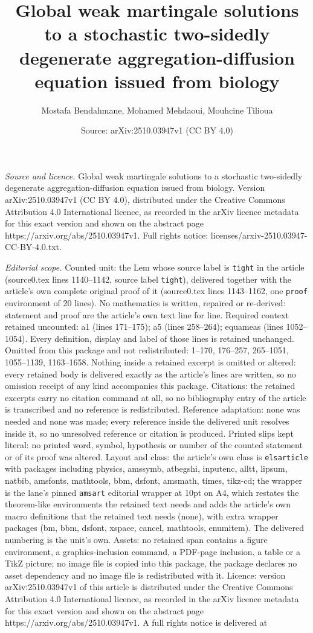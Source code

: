 \documentclass[10pt,a4paper]{amsart}
\title[Global weak martingale solutions to a stochastic two-sidedly]{Global weak martingale solutions to a stochastic two-sidedly degenerate aggregation-diffusion equation issued from biology}
\author{Mostafa Bendahmane, Mohamed Mehdaoui, Mouhcine Tilioua}
\date{Source: arXiv:2510.03947v1 (CC BY 4.0)}
\begin{document}
\maketitle

\noindent\emph{Source and licence.} Global weak martingale solutions to a stochastic two-sidedly degenerate aggregation-diffusion equation issued from biology. Version arXiv:2510.03947v1 (CC BY 4.0), distributed under the Creative Commons Attribution 4.0 International licence, as recorded in the arXiv licence metadata for this exact version and shown on the abstract page https://arxiv.org/abs/2510.03947v1. Full rights notice: licenses/arxiv-2510.03947-CC-BY-4.0.txt.\par\smallskip

\noindent\textit{Editorial scope.} Counted unit: the Lem whose source label is \texttt{tight} in the article (source0.tex lines 1140--1142, source label \texttt{tight}), delivered together with the article's own complete original proof of it (source0.tex lines 1143--1162, one \texttt{proof} environment of 20 lines). No mathematics is written, repaired or re-derived: statement and proof are the article's own text line for line. Required context retained uncounted: a1 (lines 171--175); a5 (lines 258--264); equameas (lines 1052--1054). Every definition, display and label of those lines is retained unchanged. Omitted from this package and not redistributed: 1--170, 176--257, 265--1051, 1055--1139, 1163--1658. Nothing inside a retained excerpt is omitted or altered: every retained body is delivered exactly as the article's lines are written, so no omission receipt of any kind accompanies this package. Citations: the retained excerpts carry no citation command at all, so no bibliography entry of the article is transcribed and no reference is redistributed. Reference adaptation: none was needed and none was made; every reference inside the delivered unit resolves inside it, so no unresolved reference or citation is produced. Printed slips kept literal: no printed word, symbol, hypothesis or number of the counted statement or of its proof was altered. Layout and class: the article's own class is \texttt{elsarticle} with packages including physics, amssymb, atbegshi, inputenc, alltt, lipsum, natbib, amsfonts, mathtools, bbm, dsfont, amsmath, times, tikz-cd; the wrapper is the lane's pinned \texttt{amsart} editorial wrapper at 10pt on A4, which restates the theorem-like environments the retained text needs and adds the article's own macro definitions that the retained text needs (none), with extra wrapper packages (bm, bbm, dsfont, xspace, cancel, mathtools, enumitem). The delivered numbering is the unit's own. Assets: no retained span contains a figure environment, a graphics-inclusion command, a PDF-page inclusion, a table or a TikZ picture; no image file is copied into this package, the package declares no asset dependency and no image file is redistributed with it. Licence: version arXiv:2510.03947v1 of this article is distributed under the Creative Commons Attribution 4.0 International licence, as recorded in the arXiv licence metadata for this exact version and shown on the abstract page https://arxiv.org/abs/2510.03947v1. A full rights notice is delivered at 
\end{document}
